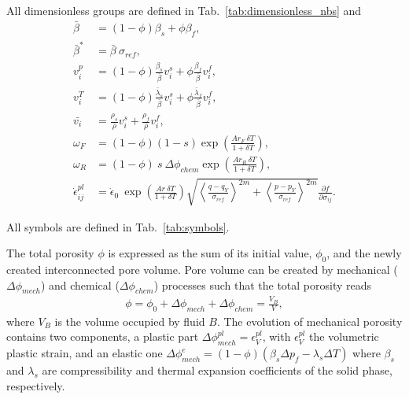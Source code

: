 \documentclass[]{scrreprt}
\begin{document}
All dimensionless groups are defined in Tab.~\ref{tab:dimensionless_nbs} and
\begin{align*}
  \bar{\beta} &= (1-\phi)\beta_s + \phi\beta_f, \\
  \bar{\beta}^* &= \bar{\beta}\:\sigma_{ref}, \\
  v_i^p &= (1-\phi)\frac{\beta_s}{\bar{\beta}} v_i^s + 
    \phi\frac{\beta_f}{\bar{\beta}}v_i^f, \\
  v^T_i &= (1-\phi)\frac{\bar{\lambda}_s}{\bar{\beta}} v_i^s + 
    \phi\frac{\bar{\lambda}_f}{\bar{\beta}} v_i^f,\\
  \bar{v_i} &= \frac{\rho_s}{\bar{\rho}} v_i^s + \frac{\rho_f}{\bar{\rho}} v_i^f, \\
  \omega_F &= (1-\phi)(1-s)\exp\left(\frac{Ar_F \: \delta T}{1 + \delta T}
  \right), \\
  \omega_R &= (1-\phi)\:s\:\Delta \phi_{chem}\exp\left(\frac{Ar_R \: \delta
  T}{1 + \delta T} \right), \\
  \dot{\epsilon}^{pl}_{ij} &= \dot \epsilon_0 \: \exp\left( \frac{Ar \: \delta
  T}{1 + \delta T}\right) \sqrt{ \left\langle\frac{q -
  q_Y}{\sigma_{ref}}\right\rangle^{2m} + \left\langle\frac{p
  - p_Y}{\sigma_{ref}}\right\rangle^{2m}} \frac{\partial f}{\partial
    \sigma_{ij}}.
\end{align*}

All symbols are defined in Tab.~\ref{tab:symbols}.

The total porosity $\phi$ is expressed as the sum of its initial value, $\phi_0$,
and the newly created interconnected pore volume. Pore volume can be created
by mechanical ($\Delta\phi_{mech}$) and chemical ($\Delta \phi_{chem}$)
processes such that the total porosity reads
\begin{eqnarray}
    \label{eq:porosity}
    \phi = \phi_0 + \Delta\phi_{mech} + \Delta\phi_{chem} = \frac{V_{B}}{V},
\end{eqnarray}
where $V_B$ is the volume occupied by fluid $B$.  The evolution of mechanical
porosity contains two components, a plastic part $\Delta
\phi^{pl}_{mech}=\epsilon^{pl}_V$, with $\epsilon^{pl}_V$ the volumetric plastic strain, and an
elastic one $\Delta \phi^{e}_{mech}=(1-\phi)\left( \beta_s \Delta p_f -
\lambda_s \Delta T \right)$
where $\beta_s$ and $\lambda_s$ are compressibility and
thermal expansion coefficients of the solid phase, respectively.
\end{document}
